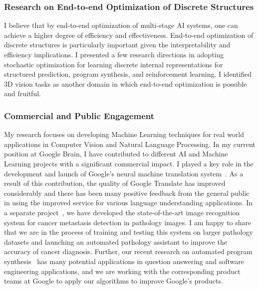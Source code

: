\documentclass[a4paper, 10pt]{article}
\newcommand{\comment}[1]{}
\begin{document}
{\vspace*{-.2cm}
\subsubsection*{Research on End-to-end Optimization of Discrete Structures}
\vspace*{-.1cm}

\hspace{\parindent} I believe that by end-to-end optimization of
multi-stage AI systems, one can achieve a higher degree of efficiency
and effectiveness. End-to-end optimization of discrete structures is
particularly important given the interpretability and efficiency
implications. I presented a few research directions in adopting
stochastic optimization for learning discrete internal representations
for structured prediction, program synthesis, and reinforcement
learning. I identified 3D vision tasks as another domain in which
end-to-end optimization is possible and fruitful.

\vspace*{-.2cm}
\subsubsection*{Commercial and Public Engagement}
\vspace*{-.1cm}
}

\hspace{\parindent} My research focuses on developing Machine Learning
techniques for real world applications in Computer Vision and Natural
Language Processing. In my current position at Google Brain, I have
contributed to different AI and Machine Learning projects with a
significant commercial impact. I played a key role in the
development and launch of Google's neural machine translation
system~\cite{wu2016gnmt}. As a result of this contribution, the
quality of Google Translate has improved considerably and there has
been many positive feedback from the general public in using the
improved service for various language understanding applications. In a
separate project~\cite{liu2017,liu2018}, we have developed the
state-of-the-art image recognition system for cancer metastasis
detection in pathology images. I am happy to share that we are in the
process of training and testing this system on larger pathology
datasets and launching an automated pathology assistant to improve the
accuracy of cancer diagnosis. Further, our recent research on
automated program synthesis~\cite{pqt2018,mapo} has many potential
applications in question answering and software engineering
applications, and we are working with the corresponding product teams
at Google to apply our algorithms to improve Google's products.
\end{document}

